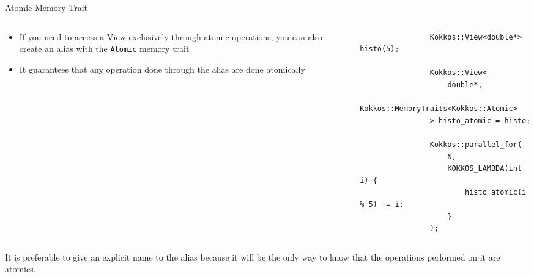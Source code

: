 \documentclass[
    aspectratio=169,
]{beamer}
\begin{document}
\begin{frame}[fragile]{Atomic Memory Trait}
    \begin{columns}
        \begin{column}{0.40\linewidth}
            \begin{itemize}
                \item If you need to access a View exclusively through atomic operations, you
                can also create an alias with the \texttt{Atomic} memory trait
                \item It guarantees that any operation done through the alias are done atomically
            \end{itemize}
        \end{column}
        \begin{column}{0.6\linewidth}
            \vspace{-0.5em}

            \begin{verbatim}
                Kokkos::View<double*> histo(5);

                Kokkos::View<
                    double*,
                    Kokkos::MemoryTraits<Kokkos::Atomic>
                > histo_atomic = histo;

                Kokkos::parallel_for(
                    N,
                    KOKKOS_LAMBDA(int i) {
                        histo_atomic(i % 5) += i;
                    }
                );
            \end{verbatim}
        \end{column}
    \end{columns}
     It is preferable to give an explicit name to the alias because it will be the only way to know that the operations performed on it are atomics.
\end{frame}
\end{document}
